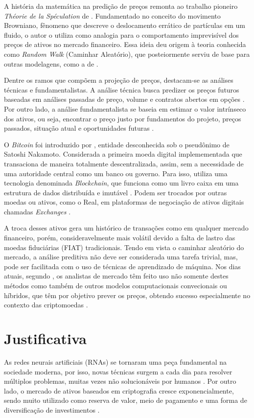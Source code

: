 A história da matemática na predição de preços remonta ao trabalho pioneiro \textit{Théorie de la Spéculation} de \textcite{Bachelier} \cite{Courtault}. Fundamentado no conceito do movimento Browniano, 
fênomeno que descreve o deslocamento errático de partículas em um fluido, o autor o utiliza como analogia para o comportamento imprevisível dos preços de ativos no mercado financeiro. 
Essa ideia deu origem à teoria conhecida como \textit{Random Walk} (Caminhar Aleatório), que posteiormente serviu de base para outras modelagens, como a de \textcite{blacksholes}.

Dentre os ramos que compõem a projeção de preços, destacam-se as análises técnicas e fundamentalistas.
A análise técnica busca predizer os preços futuros baseadas em análises passadas de preço, volume e contratos abertos em opções \cite{Pring}.
Por outro lado, a análise fundamentalista se baseia em estimar o valor intrínseco dos ativos, ou seja, encontrar o preço justo por fundamentos do projeto, preços passados, situação atual e oportunidades futuras \cite{Ahmed}.

O \textit{Bitcoin} foi introduzido por \textcite{Nakamoto}, entidade desconhecida sob o pseudônimo de Satoshi Nakamoto. 
Considerada a primeira moeda digital implemementada que transaciona de maneira totalmente descentralizada, assim, sem a necessidade de uma autoridade central como um banco ou governo. 
Para isso, utiliza uma tecnologia denominada \textit{Blockchain}, que funciona como um livro caixa em uma estrutura de dados distribuída e imutável \cite{Ledger}. Podem ser trocados por outras moedas ou ativos, como o Real, em plataformas de negociação de ativos digitais chamadas \textit{Exchanges} \cite{FakeExchanges}.

A troca desses ativos gera um histórico de transações como em qualquer mercado financeiro,
porém, consideravelmente mais volátil devido a falta de lastro das moedas fiduciárias (FIAT) tradicionais. 
Tendo em vista o caminhar aleatório do mercado, a análise preditiva não deve ser considerada uma tarefa trivial, mas, pode ser facilitada com o uso de técnicas de aprendizado de máquina.
Nos dias atuais, segundo \textcite{Fang}, os analistas de mercado têm feito uso não somente destes métodos como também de outros modelos computacionais convecionais ou híbridos, que têm por objetivo prever os preços, obtendo sucesso especialmente no contexto das criptomoedas \cite{Atsalakis}.

\section{Justificativa}
As redes neurais artificiais (RNAs) se tornaram uma peça fundamental na sociedade moderna,
por isso, novas técnicas surgem a cada dia para resolver múltiplos problemas, 
muitas vezes não solucionáveis por humanos \cite{Good}.
Por outro lado, o mercado de ativos baseados em criptografia cresce exponencialmente, 
sendo muito utilizado como reserva de valor, meio de pagamento e uma forma de diversificação de investimentos \cite{Sousa}.

